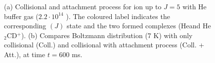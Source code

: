 \begin{figure}[!htb]
    \hfill
    
    \caption{(a) Collisional and attachment process for \CD ion up to $J=5$ with He buffer gas ($2.2 \cdot 10^{14}$ \percc). The coloured label indicates the corresponding \CD$(J)$ state and the two formed complexes (He\CD and He$_2$CD$^+$). (b) Compares Boltzmann distribution (7 K) with only collisional (Coll.) and collisional with attachment process (Coll. + Att.), at time $t=600$ ms. }
    \label{fig:ROSAA-sim-attachment-boltzman-comparision}
\end{figure}
